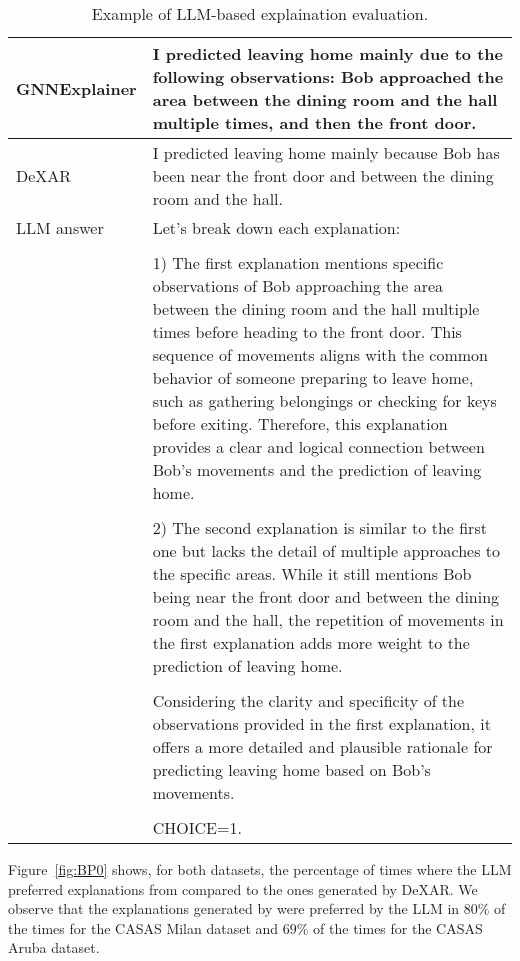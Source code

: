 \begin{table}[h]
    \caption{Example of LLM-based explaination evaluation.}
    \label{tab:llm-example}
    \centering
\begin{tabular}{|p{2.5cm}|p{9.5cm}|} %
  \hline 
  GNNExplainer & I predicted leaving home mainly due to the following observations:  Bob approached the area between the dining room and the hall multiple times, and then the front door. \\
  \hline
  DeXAR &  I predicted leaving home mainly because Bob has been near the front door and between the dining room and the hall.\\
  \hline
  LLM answer &  Let's break down each explanation: \\ & \\ & 1) The first explanation mentions specific observations of Bob approaching the area between the dining room and the hall multiple times before heading to the front door. This sequence of movements aligns with the common behavior of someone preparing to leave home, such as gathering belongings or checking for keys before exiting. Therefore, this explanation provides a clear and logical connection between Bob's movements and the prediction of leaving home. \\ & \\ & 2) The second explanation is similar to the first one but lacks the detail of multiple approaches to the specific areas. While it still mentions Bob being near the front door and between the dining room and the hall, the repetition of movements in the first explanation adds more weight to the prediction of leaving home.  \\ & \\ & Considering the clarity and specificity of the observations provided in the first explanation, it offers a more detailed and plausible rationale for predicting leaving home based on Bob's movements. \\ & \\ & CHOICE=1.\\
  \hline
\end{tabular}
\end{table}

Figure~\ref{fig:BP0} shows, for both datasets, the percentage of times where the LLM preferred explanations from \acronym{} compared to the ones generated by DeXAR. We observe that the explanations generated by \acronym{} were preferred by the LLM in $80\%$ of the times for the CASAS Milan dataset and $69\%$ of the times for the CASAS Aruba dataset.

